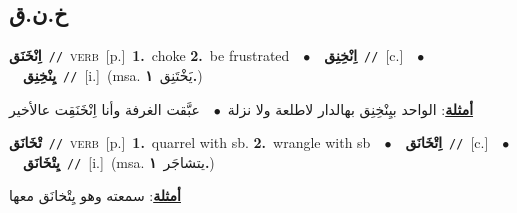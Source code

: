 \documentclass[10pt,a4paper,twoside]{article} %
\begin{document}
\begin{multicols}{2}
\vspace{-3mm}
\subsection*{\color{blue}\foreignlanguage{arabic}{خ.ن.ق}\color{blue}{}} 

{\setlength\topsep{0pt}\textbf{\foreignlanguage{arabic}{اِنْخَنَق}}\ {\color{gray}\texttt{//}\color{black}}\ \textsc{verb}\ [p.]\ \textbf{1.}~choke  \textbf{2.}~be frustrated\ \ $\bullet$\ \ \setlength\topsep{0pt}\textbf{\foreignlanguage{arabic}{اِنْخِنِق}}\ {\color{gray}\texttt{//}\color{black}}\ [c.]\ \ $\bullet$\ \ \setlength\topsep{0pt}\textbf{\foreignlanguage{arabic}{يِنْخِنِق}}\ {\color{gray}\texttt{//}\color{black}}\ [i.]\ \color{gray}(msa. \foreignlanguage{arabic}{يَخْتَنِق}~\foreignlanguage{arabic}{\textbf{١.}})\color{black}\  \begin{flushright}\color{gray}\foreignlanguage{arabic}{\textbf{\underline{\foreignlanguage{arabic}{أمثلة}}}: الواحد بيِنْخِنِق بهالدار لاطلعة ولا نزلة\ $\bullet$\ \  عبَّقت الغرفة وأنا اِنْخَنَقِت عالأخير}\end{flushright}\color{black}} \vspace{2mm}

{\setlength\topsep{0pt}\textbf{\foreignlanguage{arabic}{تْخَانَق}}\ {\color{gray}\texttt{//}\color{black}}\ \textsc{verb}\ [p.]\ \textbf{1.}~quarrel with sb.  \textbf{2.}~wrangle with sb\ \ $\bullet$\ \ \setlength\topsep{0pt}\textbf{\foreignlanguage{arabic}{اِتْخَانَق}}\ {\color{gray}\texttt{//}\color{black}}\ [c.]\ \ $\bullet$\ \ \setlength\topsep{0pt}\textbf{\foreignlanguage{arabic}{يِتْخَانَق}}\ {\color{gray}\texttt{//}\color{black}}\ [i.]\ \color{gray}(msa. \foreignlanguage{arabic}{يتشاجَر}~\foreignlanguage{arabic}{\textbf{١.}})\color{black}\  \begin{flushright}\color{gray}\foreignlanguage{arabic}{\textbf{\underline{\foreignlanguage{arabic}{أمثلة}}}: سمعته وهو يِتْخانَق معها}\end{flushright}\color{black}} \vspace{2mm}


\end{multicols}
\end{document}
